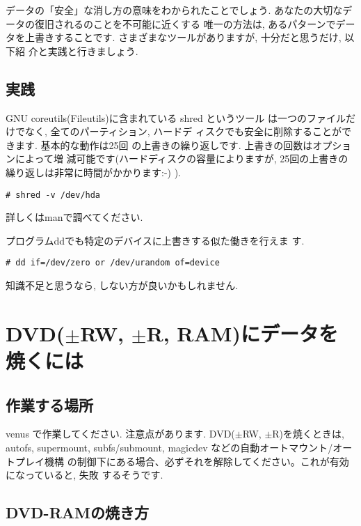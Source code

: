 \documentclass{jarticle}
\begin{document}
データの「安全」な消し方の意味をわかられたことでしょう.
あなたの大切なデータの復旧されるのことを不可能に近くする
唯一の方法は, あるパターンでデータを上書きすることです.
さまざまなツールがありますが, 十分だと思うだけ, 以下紹
介と実践と行きましょう.

\subsection{実践} 

GNU coreutils(Fileutils)に含まれている shred というツール
は一つのファイルだけでなく, 全てのパーティション, ハードデ
ィスクでも安全に削除することができます. 基本的な動作は25回
の上書きの繰り返しです. 上書きの回数はオプションによって増
減可能です(ハードディスクの容量によりますが, 25回の上書きの
繰り返しは非常に時間がかかります:-) ).

\begin{verbatim}
# shred -v /dev/hda
\end{verbatim}
詳しくはmanで調べてください.

プログラムddでも特定のデバイスに上書きする似た働きを行えま
す.

\begin{verbatim}
# dd if=/dev/zero or /dev/urandom of=device
\end{verbatim}
知識不足と思うなら, しない方が良いかもしれません.

\section{DVD($\pm$RW, $\pm$R, RAM)にデータを焼くには}

\subsection{作業する場所}
venus で作業してください. 注意点があります.
DVD($\pm$RW, $\pm$R)を焼くときは, autofs, supermount, subfs/submount, magicdev
などの自動オートマウント/オートプレイ機構
の制御下にある場合、必ずそれを解除してください。これが有効になっていると, 失敗
するそうです. %


\subsection{DVD-RAMの焼き方}
\end{document}
